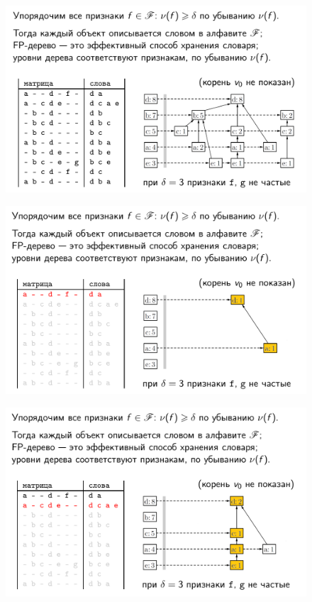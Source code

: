 \documentclass{beamer}
\begin{document}
\begin{frame}
	\begin{figure}[h]
		\centering
		\includegraphics[scale=0.45]{images/lec08-pic32.png}
	\end{figure}
\end{frame}

\begin{frame}
	\begin{figure}[h]
		\centering
		\includegraphics[scale=0.45]{images/lec08-pic33.png}
	\end{figure}
\end{frame}

\begin{frame}
	\begin{figure}[h]
		\centering
		\includegraphics[scale=0.45]{images/lec08-pic34.png}
	\end{figure}
\end{frame}
\end{document}
